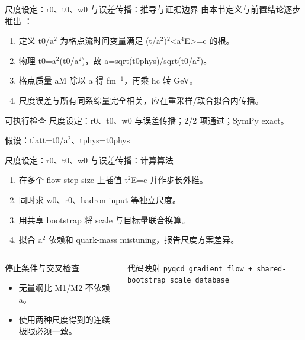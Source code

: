 \begin{frame}[t]{尺度设定：r0、t0、w0 与误差传播：推导与证据边界}
\footnotesize
{}\quad 由本节定义与前置结论逐步推出 ：
\begin{enumerate}
\item 定义 t0/\allowbreak{}a\ensuremath{^{2}} 为格点流时间变量满足 (t/\allowbreak{}a\ensuremath{^{2}})\ensuremath{^{2}}<a\ensuremath{^{4}}E>=c 的根。
\item 物理 t0=a\ensuremath{^{2}}(t0/\allowbreak{}a\ensuremath{^{2}})，故 a=sqrt(t0phys)/\allowbreak{}sqrt(t0/\allowbreak{}a\ensuremath{^{2}})。
\item 格点质量 aM 除以 a 得 fm\ensuremath{^{-1}}，再乘 ħc 转 GeV。
\item 尺度误差与所有同系综量完全相关，应在重采样/\allowbreak{}联合拟合内传播。
\end{enumerate}\begin{block}{可执行检查}
\quad 尺度设定：r0、t0、w0 与误差传播；2/2 项通过；SymPy exact。
\par\scriptsize 假设：tlatt=t0/\allowbreak{}a\ensuremath{^{2}}、tphys=t0phys
\end{block}
\end{frame}

\begin{frame}[t]{尺度设定：r0、t0、w0 与误差传播：计算算法}
\footnotesize
{}\begin{enumerate}
\item 在多个 flow step size 上插值 t\ensuremath{^{2}}E=c 并作步长外推。
\item 同时求 w0、r0、hadron input 等独立尺度。
\item 用共享 bootstrap 将 scale 与目标量联合换算。
\item 拟合 a\ensuremath{^{2}} 依赖和 quark-mass mistuning，报告尺度方案差异。
\end{enumerate}\begin{columns}[T,onlytextwidth]
\begin{block}{停止条件与交叉检查}\scriptsize\begin{itemize}
\item[\CheckMark] 无量纲比 M1/\allowbreak{}M2 不依赖 a。
\item[\CheckMark] 使用两种尺度得到的连续极限必须一致。
\end{itemize}\end{block}
\begin{block}{代码映射}
\scriptsize \texttt{pyqcd gradient flow + shared-bootstrap scale database}
\end{block}\end{columns}\end{frame}

